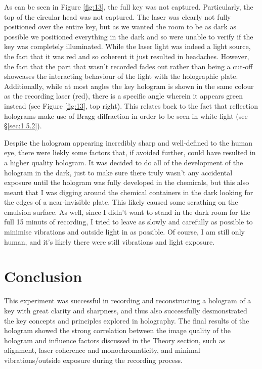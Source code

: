 \documentclass[12pt]{article}
\begin{document}
As can be seen in Figure \ref{fig:13}, the full key was not captured. Particularly, the top of the circular head was not captured. The laser was clearly not fully positioned over the entire key, but as we wanted the room to be as dark as
possible we positioned everything in the dark and so were unable to verify if the key was completely illuminated. While the laser light was indeed a light source, the fact that it was red and so coherent it just resulted in headaches.
However, the fact that the part that wasn't recorded fades out rather than being a cut-off showcases the interacting behaviour of the light with the holographic plate. Additionally, while at most angles the key hologram is shown in the same colour
as the recording laser (red), there is a specific angle wherein it appears green instead (see Figure \ref{fig:13}, top right). This relates back to the fact that reflection holograms make use of Bragg diffraction in order to be seen in white light (see §\ref{sec:1.5.2}).

Despite the hologram appearing incredibly sharp and well-defined to the human eye, there were liekly some factors that, if avoided further, could have resulted in a higher quality hologram. It was decided to do all of the development of the hologram in the dark, just to make
sure there truly wasn't any accidental exposure until the hologram was fully developed in the chemicals, but this also meant that I was digging around the chemical containers in the dark looking for the edges of a near-invisible plate. This likely caused some scrathing on the emulsion surface.
As well, since I didn't want to stand in the dark room for the full 15 minuts of recording, I tried to leave as slowly and carefully as possible to minimise vibrations and outside light in as possible. Of course, I am still only human,
and it's likely there were still vibrations and light exposure. 

\section{Conclusion} \label{sec:4}

This experiment was successful in recording and reconstructing a hologram of a key with great clarity and sharpness, and thus also successfully desmonstrated the key concepts and principles explored in holography.
The final results of the hologram showed the strong correlation between the image quality of the hologram and influence factors discussed in the Theory section, such as alignment, laser coherence and monochromaticity, and minimal vibrations/outside exposure
during the recording process.
\end{document}
